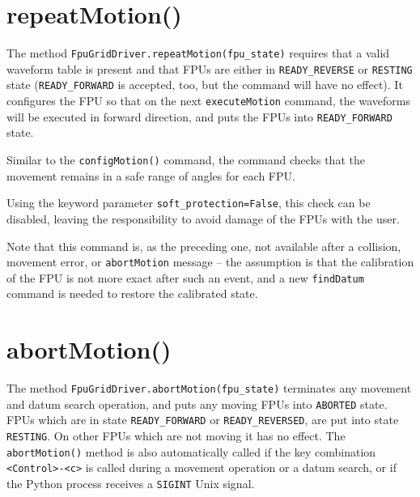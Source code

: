 \documentclass[fontsize=12,a4paper]{scrreprt}
\begin{document}
\section{repeatMotion()}

\begin{sloppypar}
The method \texttt{FpuGridDriver.repeatMotion(fpu\_state)} requires
that a valid waveform table is present and that FPUs are either in
\texttt{READY\_REVERSE} or \texttt{RESTING} state
(\texttt{READY\_FORWARD} is accepted, too, but the command will have
no effect). It configures the FPU so that on the next
\texttt{executeMotion} command, the waveforms will be executed in
forward direction, and puts the FPUs into \texttt{READY\_FORWARD}
state.
\end{sloppypar}

Similar to the \texttt{configMotion()} command, the command checks
that the movement remains in a safe range of angles for each
FPU.

Using the keyword parameter \texttt{soft\_protection=False}, this
check can be disabled, leaving the responsibility to avoid damage of
the FPUs with the user.

Note that this command is, as the preceding one, not available after a
collision, movement error, or \texttt{abortMotion} message -- the
assumption is that the calibration of the FPU is not more exact after
such an event, and a new \texttt{findDatum} command is needed to
restore the calibrated state.


\section{abortMotion()}


\begin{sloppypar}
The method \texttt{FpuGridDriver.abortMotion(fpu\_state)} terminates
any movement and datum search operation, and puts any moving FPUs into
\texttt{ABORTED} state. FPUs which are in state \texttt{READY\_FORWARD}
or \texttt{READY\_REVERSED}, are put into state \texttt{RESTING}.  On
other FPUs which are not moving it has no effect.  The
\texttt{abortMotion()} method is also automatically called if the key
combination \verb+<Control>-<c>+ is called during a movement operation
or a datum search, or if the Python process receives a \texttt{SIGINT}
Unix signal.
\end{sloppypar}
\end{document}
